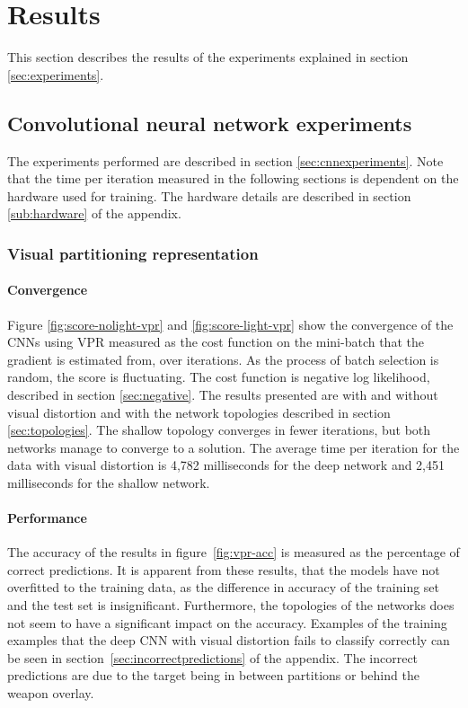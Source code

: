 
\section{Results}
This section describes the results of the experiments explained in section \ref{sec:experiments}.

\label{sec:results}

\subsection{Convolutional neural network experiments}
The experiments performed are described in section \ref{sec:cnnexperiments}. Note that the time per iteration measured in the following sections is dependent on the hardware used for training. The hardware details are described in section \ref{sub:hardware} of the appendix.

\subsubsection{Visual partitioning representation}
\paragraph{Convergence}
Figure \ref{fig:score-nolight-vpr} and \ref{fig:score-light-vpr} show the convergence of the CNNs using VPR measured as the cost function on the mini-batch that the gradient is estimated from, over iterations. As the process of batch selection is random, the score is fluctuating. The cost function is negative log likelihood, described in section \ref{sec:negative}.
The results presented are with and without visual distortion and with the network topologies described in section \ref{sec:topologies}. The shallow topology converges in fewer iterations, but both networks manage to converge to a solution. The average time per iteration for the data with visual distortion is 4,782 milliseconds for the deep network and 2,451 milliseconds for the shallow network.

\vspace{-5mm}

\paragraph{Performance}
The accuracy of the results in figure~\ref{fig:vpr-acc} is measured as the percentage of correct predictions. It is apparent from these results, that the models have not overfitted to the training data, as the difference in accuracy of the training set and the test set is insignificant. Furthermore, the topologies of the networks does not seem to have a significant impact on the accuracy. Examples of the training examples that the deep CNN with visual distortion fails to classify correctly can be seen in section~\ref{sec:incorrectpredictions} of the appendix. The incorrect predictions are due to the target being in between partitions or behind the weapon overlay.

